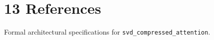 \section{13 References}

Formal architectural specifications for \texttt{svd_compressed_attention}.
